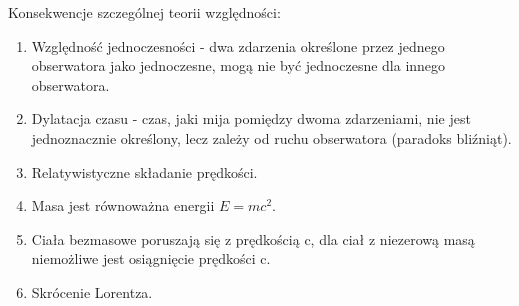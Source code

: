 Konsekwencje szczególnej teorii względności:

\begin{enumerate}[-]
\item Względność jednoczesności - dwa zdarzenia określone przez jednego obserwatora jako jednoczesne, mogą nie być jednoczesne dla innego obserwatora.
\item Dylatacja czasu - czas, jaki mija pomiędzy dwoma zdarzeniami, nie jest jednoznacznie określony, lecz zależy od ruchu obserwatora (paradoks bliźniąt).
\item Relatywistyczne składanie prędkości.
\item Masa jest równoważna energii $ E=mc^2 $.
\item Ciała bezmasowe poruszają się z prędkością c, dla ciał z niezerową masą niemożliwe jest osiągnięcie prędkości c.
\item Skrócenie Lorentza.
\end{enumerate}